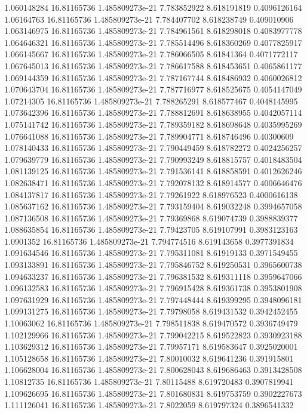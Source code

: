 {1.060148284 16.81165736 1.485809273e-21 7.783852922 8.618191819 0.4096126164
1.06164763 16.81165736 1.485809273e-21 7.784407702 8.618238749 0.409010906
1.063146975 16.81165736 1.485809273e-21 7.784961561 8.618298018 0.4083977778
1.064646321 16.81165736 1.485809273e-21 7.785514496 8.618360269 0.4077825917
1.066145667 16.81165736 1.485809273e-21 7.786066505 8.61841364 0.4071772117
1.067645013 16.81165736 1.485809273e-21 7.786617588 8.618453651 0.4065861177
1.069144359 16.81165736 1.485809273e-21 7.787167744 8.618486932 0.4060026812
1.070643704 16.81165736 1.485809273e-21 7.787716977 8.618525675 0.4054147049
1.07214305 16.81165736 1.485809273e-21 7.788265291 8.618577467 0.4048145995
1.073642396 16.81165736 1.485809273e-21 7.788812691 8.618638955 0.4042057114
1.075141742 16.81165736 1.485809273e-21 7.789359182 8.618698648 0.4035995269
1.076641088 16.81165736 1.485809273e-21 7.789904771 8.618746496 0.40300609
1.078140433 16.81165736 1.485809273e-21 7.790449459 8.618782272 0.4024256257
1.079639779 16.81165736 1.485809273e-21 7.790993249 8.618815757 0.4018483504
1.081139125 16.81165736 1.485809273e-21 7.791536141 8.618858591 0.4012626246
1.082638471 16.81165736 1.485809273e-21 7.792078132 8.618914577 0.4006646476
1.084137817 16.81165736 1.485809273e-21 7.79261922 8.618976523 0.4000616138
1.085637162 16.81165736 1.485809273e-21 7.793159404 8.619032248 0.3994657058
1.087136508 16.81165736 1.485809273e-21 7.79369868 8.619074739 0.3988839377
1.088635854 16.81165736 1.485809273e-21 7.79423705 8.619107991 0.3983123163
1.0901352 16.81165736 1.485809273e-21 7.794774516 8.619143658 0.3977391834
1.091634546 16.81165736 1.485809273e-21 7.795311081 8.61919133 0.3971549455
1.093133891 16.81165736 1.485809273e-21 7.795846752 8.619250531 0.3965600738
1.094633237 16.81165736 1.485809273e-21 7.796381532 8.619311118 0.3959647066
1.096132583 16.81165736 1.485809273e-21 7.796915428 8.619361738 0.3953801908
1.097631929 16.81165736 1.485809273e-21 7.797448444 8.619399295 0.3948096181
1.099131275 16.81165736 1.485809273e-21 7.79798058 8.619431532 0.3942452455
1.10063062 16.81165736 1.485809273e-21 7.798511838 8.619470572 0.3936749479
1.102129966 16.81165736 1.485809273e-21 7.799042215 8.619522823 0.3930923188
1.103629312 16.81165736 1.485809273e-21 7.79957171 8.619583647 0.3925020001
1.105128658 16.81165736 1.485809273e-21 7.80010032 8.619641236 0.391915801
1.106628004 16.81165736 1.485809273e-21 7.800628043 8.619686463 0.3913428508
1.10812735 16.81165736 1.485809273e-21 7.80115488 8.619720483 0.3907819941
1.109626695 16.81165736 1.485809273e-21 7.801680831 8.619753759 0.3902227673
1.111126041 16.81165736 1.485809273e-21 7.8022059 8.619797324 0.3896541332
}
